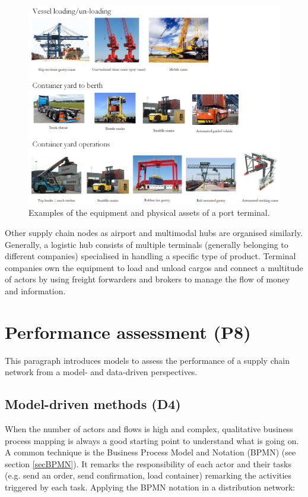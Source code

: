 \begin{figure}[hbt!]
\centering
\includegraphics[width=1.0\textwidth]{SectionDistribution/control_figures/fig_terminalInfrastructure.png}
\captionsetup{type=figure}
\caption{Examples of the equipment and physical assets of a port terminal.}
\label{fig_terminalInfrastructure}
\end{figure}

Other supply chain nodes as airport and multimodal hubs are organised similarly. Generally, a logistic hub consists of multiple terminals (generally belonging to different companies) specialised in handling a specific type of product. Terminal companies own the equipment to load and unload cargos and connect a multitude of actors by using freight forwarders and brokers to manage the flow of money and information.

\section{Performance assessment (P8)}

This paragraph introduces models to assess the performance of a supply chain network from a model- and data-driven perspectives.

\subsection{Model-driven methods (D4)}
When the number of actors and flows is high and complex, qualitative business process mapping is always a good starting point to understand what is going on. A common technique is the Business Process Model and Notation (BPMN) (see section \ref{secBPMN}). It remarks the responsibility of each actor and their tasks (e.g. send an order, send confirmation, load container) remarking the activities triggered by each task. Applying the BPMN notation in a distribution network:

